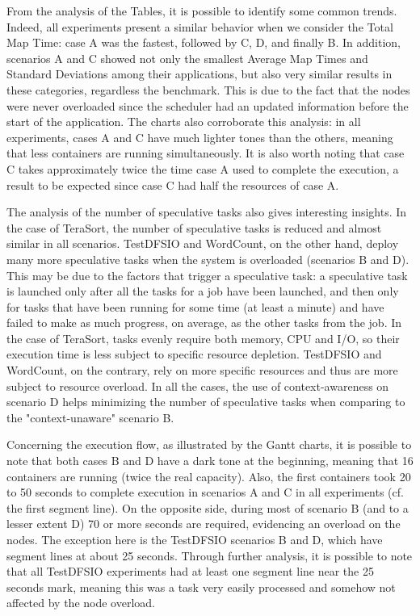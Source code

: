 From the analysis of the Tables, it is possible to identify some common trends. Indeed, all experiments present a similar behavior when we consider the Total Map Time: case A was the fastest, followed by C, D, and finally B. In addition, scenarios A and C showed not only the smallest Average Map Times and Standard Deviations among their applications, but also very similar results in these categories, regardless the benchmark. This is due to the fact that the nodes were never overloaded since the scheduler had an updated information before the start of the application. The charts also corroborate this analysis: in all experiments, cases A and C have much lighter tones than the others, meaning that less containers are running simultaneously. It is also worth noting that case C takes approximately twice the time case A used to complete the execution, a result to be expected since case C had half the resources of case A. 

The analysis of the number of speculative tasks also gives interesting insights. In the case of TeraSort, the number of speculative tasks is reduced and almost similar in all scenarios. TestDFSIO and WordCount, on the other hand, deploy many more speculative tasks when the system is overloaded (scenarios B and D). This may be due to the factors that trigger a speculative task: a speculative task is launched only after all the tasks for a job have been launched, and then only for tasks that have been running for some time (at least a minute) and have failed to make as much progress, on average, as the other tasks from the job. In the case of TeraSort, tasks evenly require both memory, CPU and I/O, so their execution time is less subject to specific resource depletion. TestDFSIO and WordCount, on the contrary, rely on more specific resources and thus are more subject to resource overload. In all the cases, the use of context-awareness on scenario D helps minimizing the number of speculative tasks when comparing to the "context-unaware" scenario B.

Concerning the execution flow, as illustrated by the Gantt charts, it is possible to note that both cases B and D have a dark tone at the beginning, meaning that 16 containers are running (twice the real capacity). Also, the first containers took 20 to 50 seconds to complete execution in scenarios A and C in all experiments (cf. the first segment line). On the opposite side, during most of scenario B (and to a lesser extent D) 70 or more seconds are required, evidencing an overload on the nodes. The exception here is the TestDFSIO scenarios B and D, which have segment lines at about 25 seconds. Through further analysis, it is possible to note that all TestDFSIO experiments had at least one segment line near the 25 seconds mark, meaning this was a task very easily processed and somehow not affected by the node overload.

